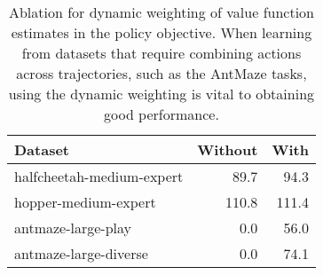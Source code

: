 \begin{table}[!htp]\centering
\caption{Ablation for dynamic weighting of value function estimates in the policy objective. When learning from datasets that require combining actions across trajectories, such as the AntMaze tasks, using the dynamic weighting is vital to obtaining good performance.}\label{tab:abl_dynamic_weighting}
\small
\begin{tabular}{l||rr}
Dataset & Without & With \\ \hline

halfcheetah-medium-expert & 89.7  & 94.3  \\
hopper-medium-expert & 110.8  & 111.4 \\

antmaze-large-play & 0.0 & 56.0 \\ 
antmaze-large-diverse & 0.0 & 74.1 \\ 

\hline
\end{tabular}
\end{table}

